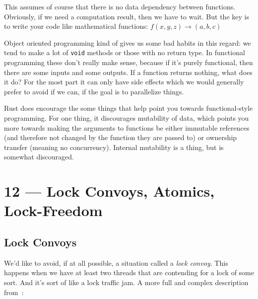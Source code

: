 \documentclass[a4paper]{report}
\begin{document}
This assumes of course that there is no data dependency between functions. Obviously, if we need a computation result, then we have to wait.  But the key is to write your code like mathematical functions: $f(x, y, z) \rightarrow (a, b, c)$

Object oriented programming kind of gives us some bad habits in this regard: we tend to make a lot of \texttt{void} methods or those with no return type. In functional programming these don't really make sense, because if it's purely functional, then there are some inputs and some outputs. If a function returns nothing, what does it do? For the most part it can only have side effects which we would generally prefer to avoid if we can, if the goal is to parallelize things.

Rust does encourage the some things that help point you towards functional-style programming. For one thing, it discourages mutability of data, which points you more towards making the arguments to functions be either immutable references (and therefore not changed by the function they are passed to) or ownership transfer (meaning no concurrency). Internal mutability is a thing, but is somewhat discouraged.









\chapter*{12 --- Lock Convoys, Atomics, Lock-Freedom}


\section*{Lock Convoys}

We'd like to avoid, if at all possible, a situation called a \textit{lock convoy}. This happens when we have at least two threads that are contending for a lock of some sort. And it's sort of like a lock traffic jam. A more full and complex description from~\cite{lockconvoys}:
\end{document}
